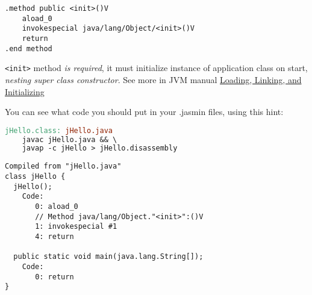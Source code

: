 \begin{lstlisting}
.method public <init>()V
	aload_0
	invokespecial java/lang/Object/<init>()V
	return
.end method
\end{lstlisting}
\verb|<init>|  method \emph{is required}, it must initialize
instance of application class on start, \emph{nesting super class constructor}.
See more in JVM manual
\href{https://docs.oracle.com/javase/specs/jvms/se7/html/jvms-5.html}{Loading, Linking, and Initializing}

\medskip
You can see what code you should put in your .jasmin files, using this hint:
\begin{lstlisting}[language=make,title=java/Makefile]
jHello.class: jHello.java
	javac jHello.java && \
	javap -c jHello > jHello.disassembly
\end{lstlisting}

\begin{lstlisting}[title=java/jHello.disassembly]
Compiled from "jHello.java"
class jHello {
  jHello();
    Code:
       0: aload_0
       // Method java/lang/Object."<init>":()V
       1: invokespecial #1                  
       4: return

  public static void main(java.lang.String[]);
    Code:
       0: return
}
\end{lstlisting}


